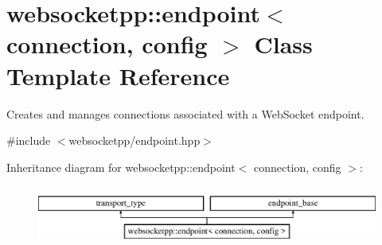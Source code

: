 \hypertarget{classwebsocketpp_1_1endpoint}{}\section{websocketpp\+:\+:endpoint$<$ connection, config $>$ Class Template Reference}
\label{classwebsocketpp_1_1endpoint}


Creates and manages connections associated with a Web\+Socket endpoint.  




{\ttfamily \#include $<$websocketpp/endpoint.\+hpp$>$}

Inheritance diagram for websocketpp\+:\+:endpoint$<$ connection, config $>$\+:\begin{figure}[H]
\begin{center}
\leavevmode
\includegraphics[height=2.000000cm]{classwebsocketpp_1_1endpoint}
\end{center}
\end{figure}
